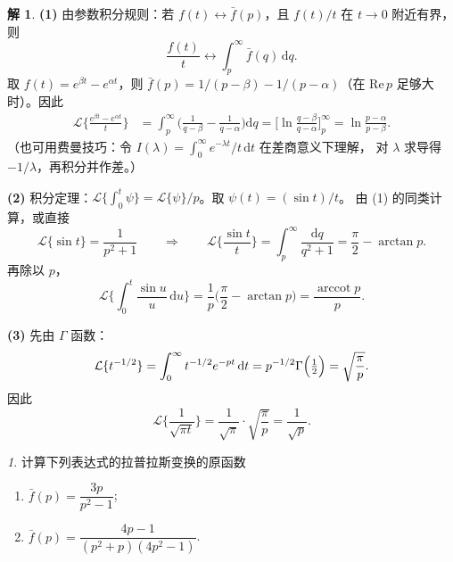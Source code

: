 \documentclass[11pt]{article}
\theoremstyle{remark}
\newtheorem{problem}{}
\theoremstyle{definition}
\newtheorem{solution}{解}
\begin{document}
\begin{solution}
\noindent\textbf{(1)}
由参数积分规则：若 $f(t)\longleftrightarrow\bar f(p)$，且 $f(t)/t$ 在 $t\to 0$ 附近有界，则
\[
\frac{f(t)}{t}
\longleftrightarrow
\int_p^{\infty}\bar f(q)\,\mathrm{d}q.
\]
取 $f(t)=e^{\beta t}-e^{\alpha t}$，则
$\bar f(p)=1/(p-\beta)-1/(p-\alpha)$（在 $\mathrm{Re}\,p$ 足够大时）。因此
\begin{align*}
\mathcal{L}\Biggl\{\frac{e^{\beta t}-e^{\alpha t}}{t}\Biggr\}
&=\int_p^{\infty}
  \Biggl(\frac{1}{q-\beta}-\frac{1}{q-\alpha}\Biggr)\mathrm{d}q
=\Biggl[\ln\frac{q-\beta}{q-\alpha}\Biggr]_p^{\infty}
=\ln\frac{p-\alpha}{p-\beta}.
\end{align*}
（也可用费曼技巧：令 $I(\lambda)=\int_0^{\infty}e^{-\lambda t}/t\,\mathrm{d}t$ 在差商意义下理解，
对 $\lambda$ 求导得 $-1/\lambda$，再积分并作差。）

\medskip
\noindent\textbf{(2)}
积分定理：$\mathcal{L}\{\int_0^t\psi\}=\mathcal{L}\{\psi\}/p$。取 $\psi(t)=(\sin t)/t$。
由 (1) 的同类计算，或直接
\[
\mathcal{L}\{\sin t\}=\frac{1}{p^2+1}
\qquad\Longrightarrow\qquad
\mathcal{L}\Biggl\{\frac{\sin t}{t}\Biggr\}
=\int_p^{\infty}\frac{\mathrm{d}q}{q^2+1}
=\frac{\pi}{2}-\arctan p.
\]
再除以 $p$，
\[
\mathcal{L}\Biggl\{\int_0^t\frac{\sin u}{u}\,\mathrm{d}u\Biggr\}
=\frac{1}{p}\Biggl(\frac{\pi}{2}-\arctan p\Biggr)
=\frac{\operatorname{arccot} p}{p}.
\]

\medskip
\noindent\textbf{(3)}
先由 $\Gamma$ 函数：
\[
\mathcal{L}\{t^{-1/2}\}
=\int_0^{\infty}t^{-1/2}e^{-pt}\,\mathrm{d}t
=p^{-1/2}\Gamma\Bigl(\tfrac12\Bigr)
=\sqrt{\frac{\pi}{p}}.
\]
因此
\[
\mathcal{L}\Biggl\{\frac{1}{\sqrt{\pi t}}\Biggr\}
=\frac{1}{\sqrt{\pi}}\cdot\sqrt{\frac{\pi}{p}}
=\frac{1}{\sqrt{p}}.
\]
\end{solution}

\begin{problem}
  计算下列表达式的拉普拉斯变换的原函数
  \begin{enumerate}
    \item $\bar f(p)=\dfrac{3p}{p^2-1}$;
    \item $\bar f(p)=\dfrac{4p-1}{(p^2+p)(4p^2-1)}$.
  \end{enumerate}
\end{problem}
\end{document}
